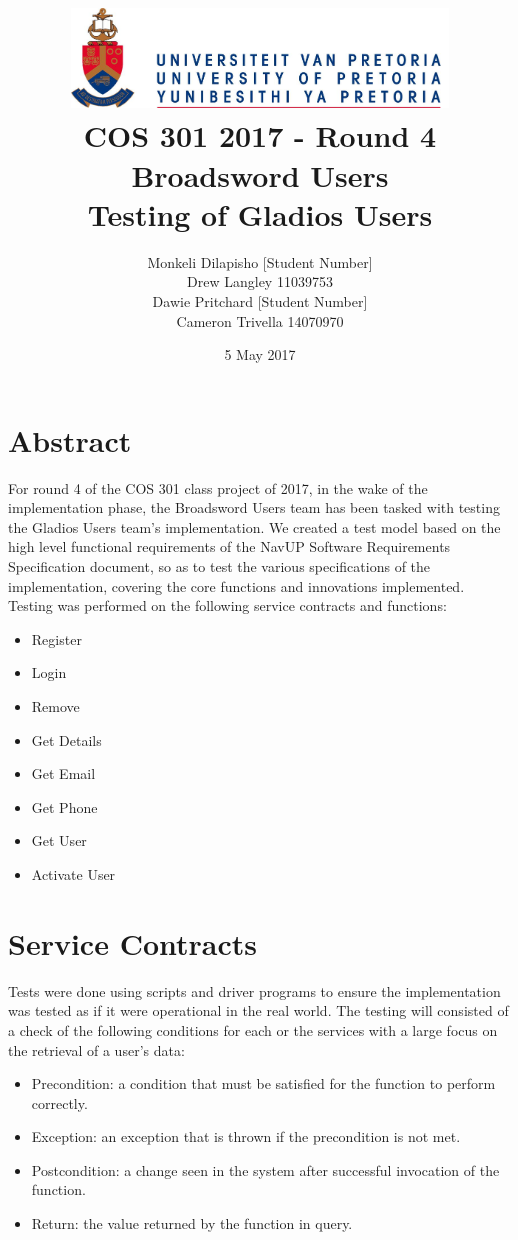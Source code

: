 \documentclass[12pt]{article}
\title{ \includegraphics[width=10cm]{up} \\ [0.5cm] COS 301 2017 - Round 4\\ Broadsword Users\\ Testing of Gladios Users }
\author{Monkeli Dilapisho \hfill [Student Number] \\ Drew Langley \hfill 11039753 \\ Dawie Pritchard \hfill [Student Number] \\ Cameron Trivella \hfill 14070970}
\date{5 May 2017}
\begin{document}
\maketitle
\pagebreak
\tableofcontents
\pagebreak


\section{Abstract}
	For round 4 of the COS 301 class project of 2017, in the wake of the implementation phase, the Broadsword Users team has been tasked with testing the Gladios Users team's 		implementation. We created a test model based on the high level functional requirements of the NavUP Software Requirements Specification document, so as to test the various 		specifications of the implementation, covering the core functions and innovations implemented.
	\\ 
	Testing was performed on the following service contracts and functions:
	\begin{itemize}
		\item Register
		\item Login
		\item Remove
		\item Get Details
		\item Get Email
		\item Get Phone 
		\item Get User
		\item Activate User
	\end{itemize}	

\pagebreak
	
\section{Service Contracts}
Tests were done using scripts and driver programs to ensure the implementation was tested as if it were operational in the real world.	
	\noindent The testing will consisted of a check of the following conditions for each or the services with a large focus on the retrieval of a user's data:\\
	 	
	 	\begin{itemize}
		\item Precondition: a condition that must be satisfied for the function to perform correctly.
		\item Exception: an exception that is thrown if the precondition is not met.
		\item Postcondition: a change seen in the system after successful invocation of the function.
		\item Return: the value returned by the function in query.
		\end{itemize}
			
\end{document}
